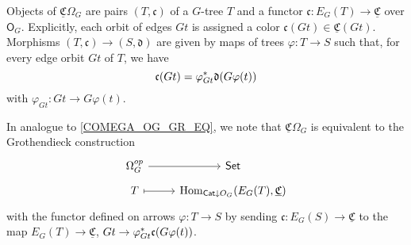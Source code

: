 \documentclass[a4paper,10pt
,draft
]{article}%
\renewcommand{\phi}{\varphi}
\newcommand{\UC}{\underline{\mathfrak C}}
\renewcommand{\1}{\ensuremath{\mathbb{id}}}
\begin{document}
Objects of $\UC \Omega_G$ are pairs $(T, \mathfrak c)$ of
a $G$-tree $T$ and
a functor $\mathfrak c: E_G(T) \to \underline{\mathfrak C}$ over $\mathsf O_G$.
Explicitly, each orbit of edges $G t$ %
is assigned a color $\mathfrak c(G t) \in \underline{\mathfrak C}(G t)$. %
Morphisms $(T, \mathfrak c) \to (S, \mathfrak d)$ 
are given by maps of trees $\phi: T \to S$ such that, for every edge orbit $G t$ of $T$, we have
\begin{equation}
      \mathfrak c(G t) = \phi_{G t}^{\**} \mathfrak d(G \phi(t))
\end{equation}
with $\phi_{G t}: G t \to G \phi(t)$.


\begin{remark}
      In analogue to \eqref{COMEGA_OG_GR_EQ}, we note that $\UC \Omega_G$ is equivalent to the Grothendieck construction
      \begin{equation}
            \label{COMEGAG_OG_GR_EQ}
            \begin{tikzcd}[row sep = tiny]
                  \Omega_G^{op} \arrow[r]
                  &
                  \mathsf{Set}
                  \\
                  T \arrow[r, mapsto]
                  &
                  \Hom_{\Cat \downarrow O_G}(E_G(T), \UC)
            \end{tikzcd}
      \end{equation}
      with the functor defined on arrows $\phi: T \to S$ by sending $\mathfrak c: E_G(S) \to \UC$ to the map
      $E_G(T) \to \UC$, $Gt \to \phi_{Gt}^{\**}\mathfrak c(G\phi(t))$. 
\end{remark}
\end{document}
